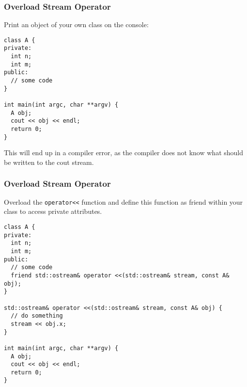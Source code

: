 \begin{frame}[fragile]
\frametitle{Overload Stream Operator}
Print an object of your own class on the console:

{\tiny
\begin{lstlisting}
class A {
private:
  int n;
  int m;
public:
  // some code
}

int main(int argc, char **argv) {
  A obj;
  cout << obj << endl;
  return 0;
}
\end{lstlisting}
}
This will end up in a compiler error, as the compiler does not know what should be
written to the cout stream.
\end{frame}

\begin{frame}[fragile]
\frametitle{Overload Stream Operator}
Overload the \verb|operator<<| function and define this function as friend
within your class to access private attributes.

{\tiny
\begin{lstlisting}
class A {
private:
  int n;
  int m;
public:
  // some code
  friend std::ostream& operator <<(std::ostream& stream, const A& obj);
}

std::ostream& operator <<(std::ostream& stream, const A& obj) {
  // do something
  stream << obj.x;
}

int main(int argc, char **argv) {
  A obj;
  cout << obj << endl;
  return 0;
}
\end{lstlisting}
}
\end{frame}
